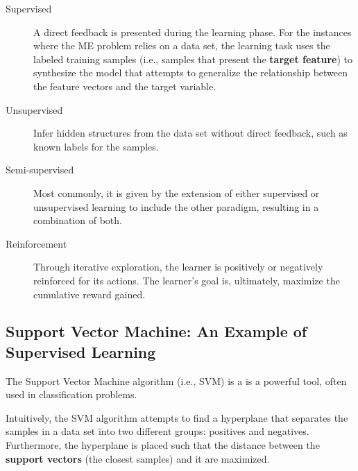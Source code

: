 \documentclass[12pt]{report}
\begin{document}
\begin{description}
	\item[Supervised] A direct feedback is presented during the learning phase. \cite{pat1996} For the instances where the ME problem relies on a data set, the learning task uses the labeled training samples (i.e., samples that present the \textbf{target feature}) to synthesize the model that attempts to generalize the relationship between the feature vectors and the target variable. \cite{awa2015}

	\item[Unsupervised] Infer hidden structures from the data set without direct feedback, such as known labels for the samples. \cite{awa2015}

	\item[Semi-supervised] Most commonly, it is given by the extension of either supervised or unsupervised learning to include the other paradigm, resulting in a combination of both. \cite{zhu2009}

	\item[Reinforcement] Through iterative exploration, the learner is positively or negatively reinforced for its actions. The learner's goal is, ultimately, maximize the cumulative reward gained. \cite{awa2015}
\end{description}

\subsection{Support Vector Machine: An Example of Supervised Learning}

The Support Vector Machine algorithm (i.e., SVM) is a is a powerful tool, often used in classification problems.

Intuitively, the SVM algorithm attempts to find a hyperplane that separates the samples in a data set into two different groups: positives and negatives. Furthermore, the hyperplane is placed such that the distance between the \textbf{support vectors} (the closest samples) and it are maximized.
\end{document}
